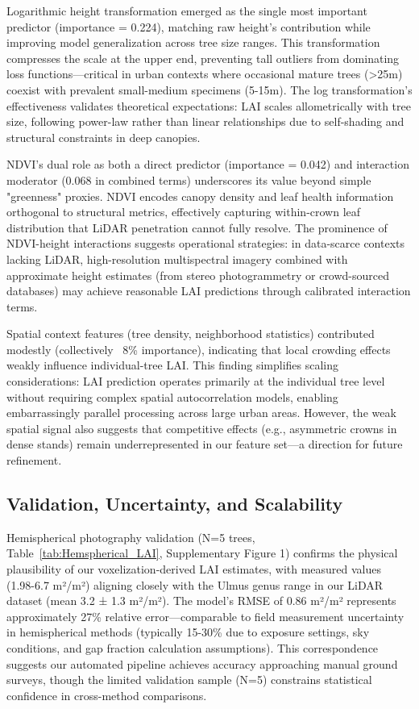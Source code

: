 Logarithmic height transformation emerged as the single most important predictor (importance = 0.224), matching raw height's contribution while improving model generalization across tree size ranges. This transformation compresses the scale at the upper end, preventing tall outliers from dominating loss functions—critical in urban contexts where occasional mature trees (>25m) coexist with prevalent small-medium specimens (5-15m). The log transformation's effectiveness validates theoretical expectations: LAI scales allometrically with tree size, following power-law rather than linear relationships due to self-shading and structural constraints in deep canopies.

NDVI's dual role as both a direct predictor (importance = 0.042) and interaction moderator (0.068 in combined terms) underscores its value beyond simple "greenness" proxies. NDVI encodes canopy density and leaf health information orthogonal to structural metrics, effectively capturing within-crown leaf distribution that LiDAR penetration cannot fully resolve. The prominence of NDVI-height interactions suggests operational strategies: in data-scarce contexts lacking LiDAR, high-resolution multispectral imagery combined with approximate height estimates (from stereo photogrammetry or crowd-sourced databases) may achieve reasonable LAI predictions through calibrated interaction terms.

Spatial context features (tree density, neighborhood statistics) contributed modestly (collectively ~8\% importance), indicating that local crowding effects weakly influence individual-tree LAI. This finding simplifies scaling considerations: LAI prediction operates primarily at the individual tree level without requiring complex spatial autocorrelation models, enabling embarrassingly parallel processing across large urban areas. However, the weak spatial signal also suggests that competitive effects (e.g., asymmetric crowns in dense stands) remain underrepresented in our feature set—a direction for future refinement.

\subsection{Validation, Uncertainty, and Scalability}

Hemispherical photography validation (N=5 trees, Table~\ref{tab:Hemspherical_LAI}, Supplementary Figure 1) confirms the physical plausibility of our voxelization-derived LAI estimates, with measured values (1.98-6.7 m²/m²) aligning closely with the Ulmus genus range in our LiDAR dataset (mean 3.2 ± 1.3 m²/m²). The model's RMSE of 0.86 m²/m² represents approximately 27\% relative error—comparable to field measurement uncertainty in hemispherical methods (typically 15-30\% due to exposure settings, sky conditions, and gap fraction calculation assumptions). This correspondence suggests our automated pipeline achieves accuracy approaching manual ground surveys, though the limited validation sample (N=5) constrains statistical confidence in cross-method comparisons.

